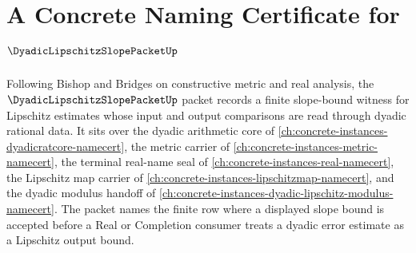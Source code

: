 \chapter{A Concrete Naming Certificate for $\DyadicLipschitzSlopePacketUp$}
\label{ch:concrete-instances-dyadic-lipschitz-slope-packet-namecert}

Following Bishop and Bridges on constructive metric and real analysis, the $\DyadicLipschitzSlopePacketUp$ packet records a finite slope-bound witness for Lipschitz estimates whose input and output comparisons are read through dyadic rational data. It sits over the dyadic arithmetic core of \autoref{ch:concrete-instances-dyadicratcore-namecert}, the metric carrier of \autoref{ch:concrete-instances-metric-namecert}, the terminal real-name seal of \autoref{ch:concrete-instances-real-namecert}, the Lipschitz map carrier of \autoref{ch:concrete-instances-lipschitzmap-namecert}, and the dyadic modulus handoff of \autoref{ch:concrete-instances-dyadic-lipschitz-modulus-namecert}. The packet names the finite row where a displayed slope bound is accepted before a Real or Completion consumer treats a dyadic error estimate as a Lipschitz output bound.

